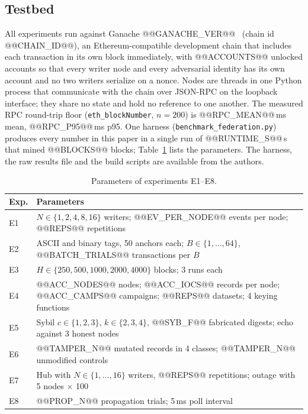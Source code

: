 \documentclass[conference]{IEEEtran}
\begin{document}
\subsection{Testbed}
All experiments run against Ganache @@GANACHE_VER@@~\cite{ref19} (chain id @@CHAIN_ID@@), an Ethereum-compatible development chain that includes each transaction in its own block immediately, with @@ACCOUNTS@@ unlocked accounts so that every writer node and every adversarial identity has its own account and no two writers serialize on a nonce. Nodes are threads in one Python process that communicate with the chain over JSON-RPC on the loopback interface; they share no state and hold no reference to one another. The measured RPC round-trip floor (\texttt{eth\_blockNumber}, $n=200$) is @@RPC_MEAN@@\,ms mean, @@RPC_P95@@\,ms p95. One harness (\texttt{benchmark\_federation.py}) produces every number in this paper in a single run of @@RUNTIME_S@@\,s that mined @@BLOCKS@@ blocks; Table~\ref{tab:params} lists the parameters. The harness, the raw results file and the build scripts are available from the authors.

\begin{table}[!t]
\caption{Parameters of experiments E1--E8.}
\label{tab:params}
\centering
\scriptsize
\setlength{\tabcolsep}{3pt}
\begin{tabular}{@{}lp{}@{}}
\toprule
Exp. & Parameters \\
\midrule
E1 & $N\in\{1,2,4,8,16\}$ writers; @@EV_PER_NODE@@ events per node; @@REPS@@ repetitions \\
E2 & ASCII and binary tags, 50 anchors each; $B\in\{1,\dots,64\}$, @@BATCH_TRIALS@@ transactions per $B$ \\
E3 & $H\in\{250,500,1000,2000,4000\}$ blocks; 3 runs each \\
E4 & @@ACC_NODES@@ nodes; @@ACC_IOCS@@ records per node; @@ACC_CAMPS@@ campaigns; @@REPS@@ datasets; 4 keying functions \\
E5 & Sybil $c\in\{1,2,3\}$, $k\in\{2,3,4\}$, @@SYB_F@@ fabricated digests; echo against 3 honest nodes \\
E6 & @@TAMPER_N@@ mutated records in 4 classes; @@TAMPER_N@@ unmodified controls \\
E7 & Hub with $N\in\{1,\dots,16\}$ writers, @@REPS@@ repetitions; outage with 5 nodes $\times$ 100 \\
E8 & @@PROP_N@@ propagation trials; 5\,ms poll interval \\
\bottomrule
\end{tabular}
\end{table}
\end{document}
